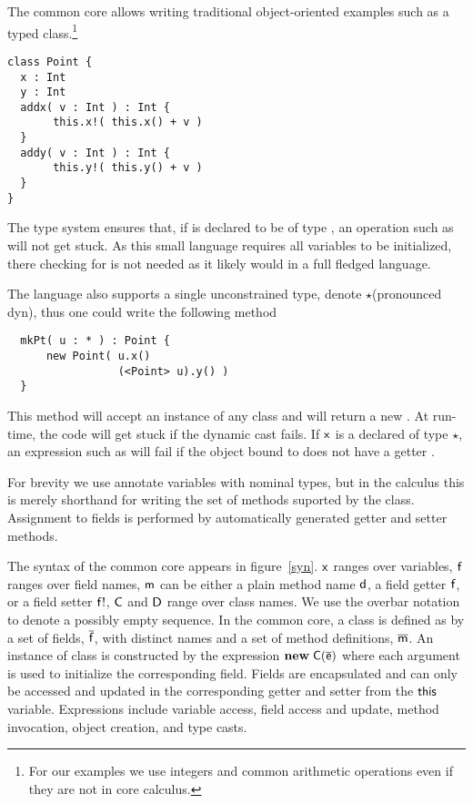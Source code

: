 \documentclass[preprint]{sigplanconf}
\newcommand{\m}{\M{\xt{m}}}
\newcommand{\e}{\M{\xt{e}}}
\renewcommand{\d}{\M{\xt{d}}}
\newcommand{\f}{\M{\xt{f}}}
\newcommand{\fb}{\M{\xt{f!}}}
\newcommand{\x}{\M{\xt{x}}}
\newcommand{\C}{\M{\xt{C}}}
\newcommand{\D}{\M{\xt{D}}}
\newcommand{\this}{\M{\xt{this}}}
\renewcommand{\d}{\M{\xt{d}}}
\newcommand{\new}{\M{\bt{new}}}
\newcommand{\New}[2]{\M{\new\;#1({#2})}}
\newcommand{\Cast}[2]{\M{\langle{#1}\rangle{#2}}}
\newcommand{\any}{\M{\star}}
\newcommand{\M}[1]{\ensuremath{#1}\xspace}
\newcommand{\xt}[1]{{\sf{#1}}\xspace}
\newcommand{\bt}[1]{\xt{\bf #1}}
\renewcommand{\b}[1]{\M{\overline{#1}}}
\begin{document}
The common core allows writing traditional object-oriented examples such as
a typed \xt{Point} class.\footnote{For our examples we use integers and
  common arithmetic operations even if they are not in core calculus.}

\begin{verbatim}
class Point {
  x : Int
  y : Int
  addx( v : Int ) : Int {
       this.x!( this.x() + v )
  }
  addy( v : Int ) : Int {
       this.y!( this.y() + v )
  }
}
\end{verbatim}

The type system ensures that, if \xt{pt} is declared to be of type
\xt{Point}, an operation such as \xt{pt.addx(42)} will not get stuck.  As
this small language requires all variables to be initialized, there checking
for \xt{null} is not needed as it likely would in a full fledged language.

The language also supports a single unconstrained type, denote \any (pronounced
dyn), thus one could write the following method

\begin{verbatim}
  mkPt( u : * ) : Point {
      new Point( u.x() 
                 (<Point> u).y() )
  }
\end{verbatim}

This method will accept an instance of any class and will return a new
\xt{Point}. At run-time, the code will get stuck if the dynamic cast
\xt{\Cast{\xt{Point}}{\xt{u}}} fails. If \x is a declared of type \any, an
expression such as \xt{u.x()} will fail if the object bound to \xt{u} does
not have a getter \xt{x()}.


For brevity we use annotate variables with nominal types, but in the
calculus this is merely shorthand for writing the set of methods suported 
by the class. Assignment to fields is performed by automatically generated
getter and setter methods.

The syntax of the common core appears in figure~\ref{syn}.  \x ranges
over variables, \f ranges over field names, \m can be either a plain method
name \d, a field getter \f, or a field setter \fb, \C and \D range over
class names. We use the overbar notation to denote a possibly empty
sequence. In the common core, a class is defined as by a set of fields,
\b\f, with distinct names and a set of method definitions, \b\m. An instance
of class is constructed by the expression \New\C{\b\e} where each argument
is used to initialize the corresponding field. Fields are encapsulated and
can only be accessed and updated in the corresponding getter and setter from
the \this variable.  Expressions include variable access, field access and
update, method invocation, object creation, and type casts.
\end{document}
